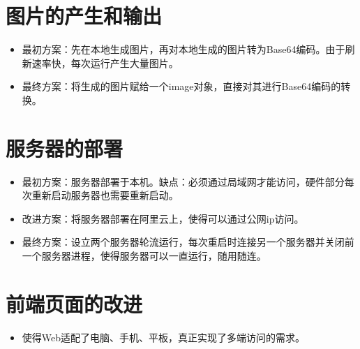 \section{图片的产生和输出}
\begin{itemize}
    \item 最初方案：先在本地生成图片，再对本地生成的图片转为Base64编码。由于刷新速率快，每次运行产生大量图片。
    \item 最终方案：将生成的图片赋给一个image对象，直接对其进行Base64编码的转换。
    \end{itemize}
\section{服务器的部署}
    \begin{itemize}
    \item 最初方案：服务器部署于本机。缺点：必须通过局域网才能访问，硬件部分每次重新启动服务器也需要重新启动。
    \item 改进方案：将服务器部署在阿里云上，使得可以通过公网ip访问。
    \item 最终方案：设立两个服务器轮流运行，每次重启时连接另一个服务器并关闭前一个服务器进程，使得服务器可以一直运行，随用随连。
    \end{itemize}
\section{前端页面的改进}
\begin{itemize}
    \item 使得Web适配了电脑、手机、平板，真正实现了多端访问的需求。
    \end{itemize}
